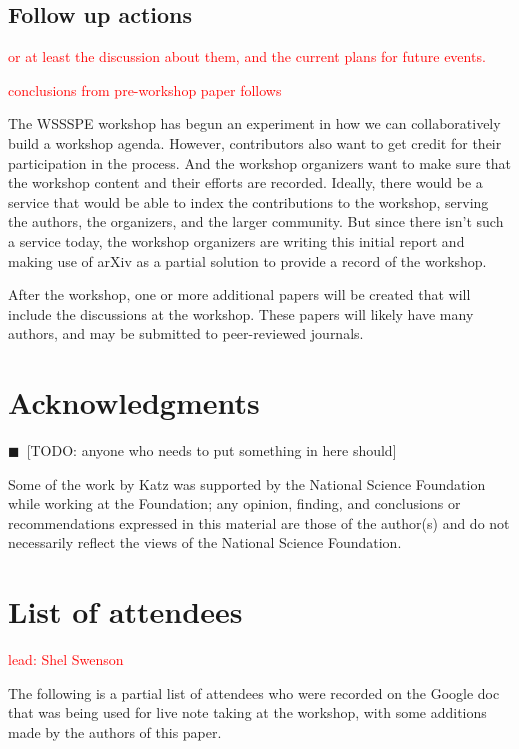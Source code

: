 \documentclass[11pt, oneside]{amsart}
\newcommand{\todo}[1]{{\color{blue}$\blacksquare$~\textsf{[TODO: #1]}}}
\newcommand{\note}[1]{ {\textcolor{red}    { #1 }}}
\begin{document}
\subsection{Follow up actions}

\note{or at least the discussion about them, and the current plans for
  future events.}

\note{conclusions from pre-workshop paper follows}

The WSSSPE workshop has begun an experiment in how we can
collaboratively build a workshop agenda. However, contributors also
want to get credit for their participation in the process. And the
workshop organizers want to make sure that the workshop content and
their efforts are recorded.  Ideally, there would be a service that
would be able to index the contributions to the workshop, serving the
authors, the organizers, and the larger community. But since there
isn't such a service today, the workshop organizers are writing this
initial report and making use of arXiv as a partial solution to
provide a record of the workshop.

After the workshop, one or more additional papers will be created that
will include the discussions at the workshop. These papers will likely
have many authors, and may be submitted to peer-reviewed journals.


\section*{Acknowledgments}

\todo{anyone who needs to put something in here should}

Some of the work by Katz was
supported by the National Science Foundation while working at the
Foundation; any opinion, finding, and conclusions or recommendations
expressed in this material are those of the author(s) and do not
necessarily reflect the views of the National Science Foundation.


\appendix
\section{List of attendees}

\note{lead: Shel Swenson}

The following is a partial list of attendees who were recorded on the
Google doc~\cite{WSSSPE1-google-notes} that was being used for live note taking at the workshop, with some additions made by the authors of this paper.
\end{document}
